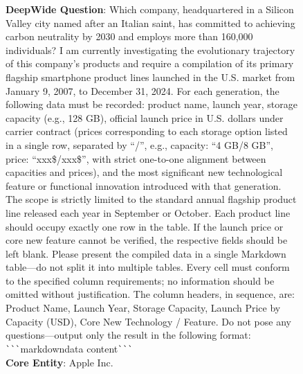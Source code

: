 \documentclass[11pt, letterpaper, logo, onecolumn, copyright, numbering]{paper_improved}
\begin{document}
\begin{figure}[htbp]
\begin{center}\end{center}\vspace{2mm}
    \begin{tcolorbox}[
        title=Input of Wide2Deep\_059 Instance,
        colback=yellow!10,
        colbacktitle=black!80,
        coltitle=white,
        arc=1mm,
        boxrule=0pt,
        breakable]
        \textbf{DeepWide Question}: Which company, headquartered in a Silicon Valley city named after an Italian saint, has committed to achieving carbon neutrality by 2030 and employs more than 160,000 individuals? I am currently investigating the evolutionary trajectory of this company’s products and require a compilation of its primary flagship smartphone product lines launched in the U.S. market from January 9, 2007, to December 31, 2024. For each generation, the following data must be recorded: product name, launch year, storage capacity (e.g., 128 GB), official launch price in U.S. dollars under carrier contract (prices corresponding to each storage option listed in a single row, separated by ``/'', e.g., capacity: ``4 GB/8 GB'', price: ``xxx\$/xxx\$'', with strict one-to-one alignment between capacities and prices), and the most significant new technological feature or functional innovation introduced with that generation. The scope is strictly limited to the standard annual flagship product line released each year in September or October. Each product line should occupy exactly one row in the table. If the launch price or core new feature cannot be verified, the respective fields should be left blank. Please present the compiled data in a single Markdown table—do not split it into multiple tables. Every cell must conform to the specified column requirements; no information should be omitted without justification. The column headers, in sequence, are: Product Name, Launch Year, Storage Capacity, Launch Price by Capacity (USD), Core New Technology / Feature. Do not pose any questions—output only the result in the following format: \verb|```|markdown{data content}\verb|```|\\
        \medskip
        \textbf{Core Entity}: Apple Inc.
    \end{tcolorbox}
    

\end{figure}
\end{document}
